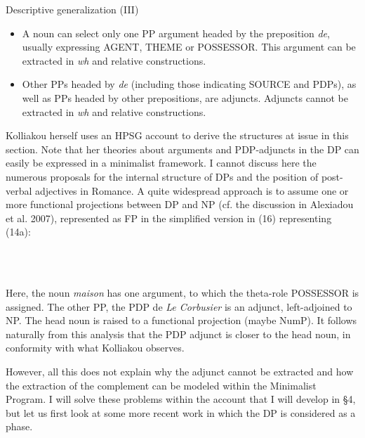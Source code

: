\documentclass[output=paper]{langsci/langscibook}
\begin{document}
          Descriptive generalization (III)

\begin{itemize}
\item A noun can select only one PP argument headed by the preposition \textit{de}, usually expressing AGENT, THEME or POSSESSOR. This argument can be extracted in \textit{wh} and relative constructions.
\item Other PPs headed by \textit{de} (including those indicating SOURCE and PDPs), as well as PPs headed by other prepositions, are adjuncts. Adjuncts cannot be extracted in \textit{wh} and relative constructions.
\end{itemize}

Kolliakou herself uses an HPSG account to derive the structures at issue in this section. Note that her theories about arguments and PDP-adjuncts in the DP can easily be expressed in a minimalist framework. I cannot discuss here the numerous proposals for the internal structure of DPs and the position of post-verbal adjectives in Romance. A quite widespread approach is to assume one or more functional projections between DP and NP (cf. the discussion in Alexiadou et al. 2007), represented as FP in the simplified version in (16) representing (14a):

    
 

\begin{styleFramecontents}
\ea%
    \label{ex:key:16}
    \gll\\
        \\
    \glt
    \z

        
\end{styleFramecontents}

Here, the noun \textit{maison} has one argument, to which the theta-role POSSESSOR is assigned. The other PP, the PDP de \textit{Le Corbusier} is an adjunct, left-adjoined to NP. The head noun is raised to a functional projection (maybe NumP). It follows naturally from this analysis that the PDP adjunct is closer to the head noun, in conformity with what Kolliakou observes.

  However, all this does not explain why the adjunct cannot be extracted and how the extraction of the complement can be modeled within the Minimalist Program. I will solve these problems within the account that I will develop in §4, but let us first look at some more recent work in which the DP is considered as a phase.
\end{document}
